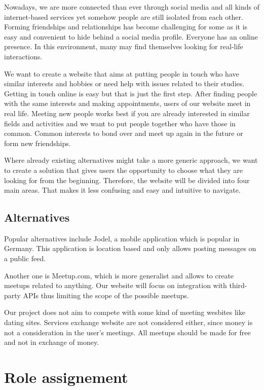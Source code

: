 \documentclass[conference]{IEEEtran}
\begin{document}
Nowadays, we are more connected than ever through social media and all kinds of internet-based services yet somehow people are still isolated from each other. Forming friendships and relationships has become challenging for some as it is easy and convenient to hide behind a social media profile. Everyone has an online presence. In this environment, many may find themselves looking for real-life interactions.

We want to create a website that aims at putting people in touch who have similar interests and hobbies or need help with issues related to their studies. Getting in touch online is easy but that is just the first step. After finding people with the same interests and making appointments, users of our website meet in real life. Meeting new people works best if you are already interested in similar fields and activities and we want to put people together who have those in common. Common interests to bond over and meet up again in the future or form new friendships.

Where already existing alternatives might take a more generic approach, we want to create a solution that gives users the opportunity to choose what they are looking for from the beginning. Therefore, the website will be divided into four main areas. That makes it less confusing and easy and intuitive to navigate.

\subsection{Alternatives}

Popular alternatives include Jodel, a mobile application which is popular in Germany. This application is location based and only allows posting messages on a public feed.

Another one is Meetup.com, which is more generalist and allows to create meetups related to anything. Our website will focus on integration with third-party APIs thus limiting the scope of the possible meetups.

Our project does not aim to compete with some kind of meeting wesbites like dating sites. Services exchange website are not considered either, since money is not a consideration in the user’s meetings. All meetups should be made for free and not in exchange of money.

\section{Role assignement}
\end{document}
